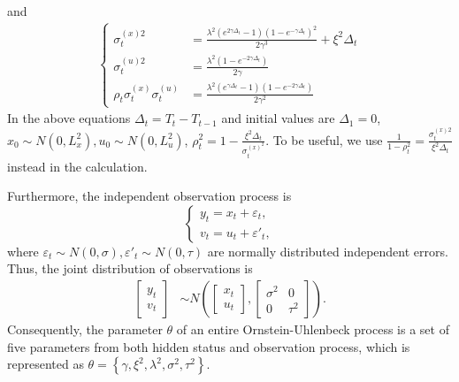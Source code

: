 and 
\begin{align}
\begin{cases}
\sigma_t^{(x)2} &=\frac{\lambda^2 \left(e^{2 \gamma\Delta_t}-1\right) \left(1 -e^{-\gamma\Delta_t}\right)^2}{2 \gamma ^3 } + \xi^2\Delta_t\\
\sigma_t^{(u)2} &= \frac{\lambda ^2 \left(1- e^{-2 \gamma\Delta_t}\right)}{2 \gamma } \\
\rho_t\sigma_t^{(x)}\sigma_t^{(u)} & =\frac{\lambda ^2 \left(e^{\gamma\Delta_t} -1\right) \left(1-e^{-2\gamma\Delta_t}\right)}{2 \gamma ^2}
\end{cases}
\end{align}
In the above equations $\Delta_t = T_t-T_{t-1}$ and initial values are $\Delta_1=0$, $x_0\sim N\left(0,L_x^2\right), u_0\sim N(0,L_u^2)$, $\rho_t^2 = 1-\frac{\xi^2 \Delta_t}{\sigma_t^{(x)^2}}$. To be useful, we use $\frac{1}{1-\rho_t^2} =\frac{\sigma_t^{(x)2}}{\xi^2 \Delta_t}$ instead in the calculation. 

Furthermore, the independent observation process is 
\begin{equation}\label{obseq}
\begin{cases} y_t=x_t+\varepsilon_t,\\ v_t=u_t+\varepsilon'_t, \end{cases} 
\end{equation}
where $\varepsilon_t\sim N(0,\sigma),\varepsilon'_t\sim N(0,\tau)$ are normally distributed independent errors. Thus, the joint distribution of observations is 
\begin{align}\label{obmodel}
\begin{bmatrix} y_t \\ v_t \end{bmatrix} &\sim N\left(
\begin{bmatrix}x_t \\ u_t \end{bmatrix} , 
\begin{bmatrix}
\sigma^2 & 0\\
0 & \tau^2
\end{bmatrix} \right).
\end{align}
Consequently, the parameter $\theta$ of an entire Ornstein-Uhlenbeck process is a set of five parameters from both hidden status and observation process, which is represented as $\theta = \left\lbrace \gamma,\xi^2,\lambda^2,\sigma^2,\tau^2 \right\rbrace$. 


